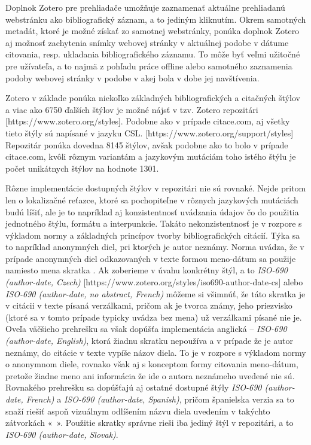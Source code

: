 \documentclass{fithesis3}
\begin{document}
	Doplnok Zotero pre prehliadače umožňuje zaznamenať aktuálne prehliadanú webstránku ako bibliografický záznam, a to jediným kliknutím. Okrem samotných metadát, ktoré je možné získať zo samotnej webstránky, ponúka doplnok Zotero aj možnosť zachytenia snímky webovej stránky v aktuálnej podobe v dátume citovania, resp. ukladania bibliografického záznamu. To môže byť veľmi užitočné pre užívateľa, a to najmä z pohľadu práce offline alebo samotného zaznamenia podoby webovej stránky v podobe v akej bola v dobe jej navštívenia.
	
	Zotero v základe ponúka niekoľko základných bibliografických a citačných štýlov a viac ako 6750 ďalších štýlov je možné nájsť v tzv. Zotero repozitári [https://www.zotero.org/styles]. Podobne ako v prípade citace.com, aj všetky tieto štýly sú napísané v jazyku CSL. [https://www.zotero.org/support/styles] Repozitár ponúka dovedna 8145 štýlov, avšak podobne ako to bolo v prípade citace.com, kvôli rôznym variantám a jazykovým mutáciám toho istého štýlu je počet unikátnych štýlov na hodnote 1301.
	
	Rôzne implementácie dostupných štýlov v repozitári nie sú rovnaké. Nejde pritom len o lokalizačné reťazce, ktoré sa pochopiteľne v rôznych jazykových mutáciách budú líšiť, ale je to napríklad aj konzistentnosť uvádzania údajov čo do použitia jednotného štýlu, formátu a interpunkcie. Takáto nekonzistentnosť je v rozpore s výkladom normy a základných princípov tvorby bibliografických citácií. Týka sa to napríklad anonymných diel, pri ktorých je autor neznámy. Norma uvádza, že v prípade anonymných diel odkazovaných v texte formou meno-dátum sa použije namiesto mena skratka . Ak zoberieme v úvahu konkrétny štýl, a to \textit{ISO-690 (author-date, Czech)} [https://www.zotero.org/styles/iso690-author-date-cs] alebo \textit{ISO-690 (author-date, no abstract, French)} môžeme si všimnúť, že táto skratka je v citácii v texte písaná verzálkami, pričom ak je tvorca známy, jeho priezvisko (ktoré sa v tomto prípade typicky uvádza bez mena) už verzálkami písané nie je. Oveľa väčšieho prehrešku sa však dopúšťa implementácia anglická -- \textit{ISO-690 (author-date, English)}, ktorá žiadnu skratku  nepoužíva a v prípade že je autor neznámy, do citácie v texte vypíše názov diela. To je v rozpore s výkladom normy o anonymnom diele, rovnako však aj s konceptom formy citovania meno-dátum, pretože žiadne meno ani informácia že ide o autora neznámeho uvedené nie sú. Rovnakého prehrešku sa dopúšťajú aj ostatné dostupné štýly \textit{ISO-690 (author-date, French)} a \textit{ISO-690 (author-date, Spanish)}, pričom španielska verzia sa to snaží riešiť aspoň vizuálnym odlíšením názvu diela uvedením v takýchto zátvorkách «~». Použitie skratky  správne rieši iba jediný štýl v repozitári, a to \textit{ISO-690 (author-date, Slovak)}.
	
\end{document}
